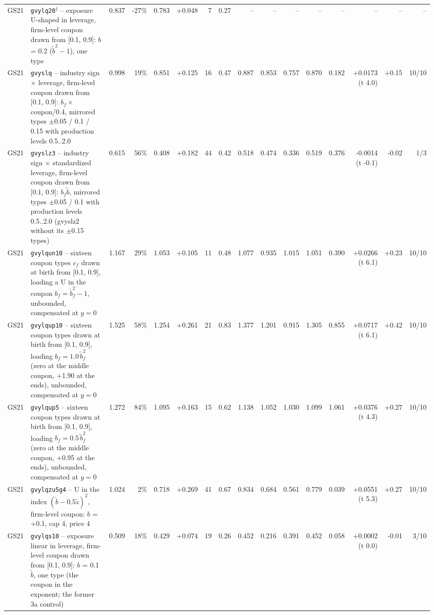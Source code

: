 \begin{landscape}
\begin{longtable}{lp{4.6cm}rrrrrrrrrrrrrr}
GS21 & \texttt{gvylq20}$^\ddagger$ -- exposure U-shaped in leverage, firm-level coupon drawn from [0.1, 0.9]: $b$ = 0.2 ($\tilde b^2 - 1$), one type & 0.837 & -27\% & 0.783 & +0.048 & 7 & 0.27 & -- & -- & -- & -- & -- & -- & -- & -- \\
GS21 & \texttt{gvyslq} -- industry sign $\times$ leverage, firm-level coupon drawn from [0.1, 0.9]: $b_f \times$ coupon/0.4, mirrored types $\pm$0.05 / 0.1 / 0.15 with production levels 0.5..2.0 & 0.998 & 19\% & 0.851 & +0.125 & 16 & 0.47 & 0.887 & 0.853 & 0.757 & 0.870 & 0.182 & +0.0173 (t 4.0) & +0.15 & 10/10 \\
GS21 & \texttt{gvyslz3} -- industry sign $\times$ standardized leverage, firm-level coupon drawn from [0.1, 0.9]: $b_f \tilde b$, mirrored types $\pm$0.05 / 0.1 with production levels 0.5..2.0 (gvyslz2 without its $\pm$0.15 types) & 0.615 & 56\% & 0.408 & +0.182 & 44 & 0.42 & 0.518 & 0.474 & 0.336 & 0.519 & 0.376 & -0.0014 (t -0.1) & -0.02 & 1/3 \\
GS21 & \texttt{gvylqun10} -- sixteen coupon types $c_f$ drawn at birth from [0.1, 0.9], loading a U in the coupon $b_f = \tilde b_f^2 - 1$, unbounded, compensated at $y = 0$ & 1.167 & 29\% & 1.053 & +0.105 & 11 & 0.48 & 1.077 & 0.935 & 1.015 & 1.051 & 0.390 & +0.0266 (t 6.1) & +0.23 & 10/10 \\
GS21 & \texttt{gvylqup10} -- sixteen coupon types drawn at birth from [0.1, 0.9], loading $b_f = 1.0\,\tilde b_f^2$ (zero at the middle coupon, +1.90 at the ends), unbounded, compensated at $y = 0$ & 1.525 & 58\% & 1.254 & +0.261 & 21 & 0.83 & 1.377 & 1.201 & 0.915 & 1.305 & 0.855 & +0.0717 (t 6.1) & +0.42 & 10/10 \\
GS21 & \texttt{gvylqup5} -- sixteen coupon types drawn at birth from [0.1, 0.9], loading $b_f = 0.5\,\tilde b_f^2$ (zero at the middle coupon, +0.95 at the ends), unbounded, compensated at $y = 0$ & 1.272 & 84\% & 1.095 & +0.163 & 15 & 0.62 & 1.138 & 1.052 & 1.030 & 1.099 & 1.061 & +0.0376 (t 4.3) & +0.27 & 10/10 \\
GS21 & \texttt{gvylqzu5g4} -- U in the index $(\tilde b - 0.5\tilde z)^2$, firm-level coupon: $b$ = +0.1, cap 4, price 4 & 1.024 & 2\% & 0.718 & +0.269 & 41 & 0.67 & 0.834 & 0.684 & 0.561 & 0.779 & 0.039 & +0.0551 (t 5.3) & +0.27 & 10/10 \\
GS21 & \texttt{gvylqs10} -- exposure linear in leverage, firm-level coupon drawn from [0.1, 0.9]: $b$ = 0.1 $\tilde b$, one type (the coupon in the exponent; the former 3a control) & 0.509 & 18\% & 0.429 & +0.074 & 19 & 0.26 & 0.452 & 0.216 & 0.391 & 0.452 & 0.058 & +0.0002 (t 0.0) & -0.01 & 3/10 \\

\end{longtable}
\end{landscape}
